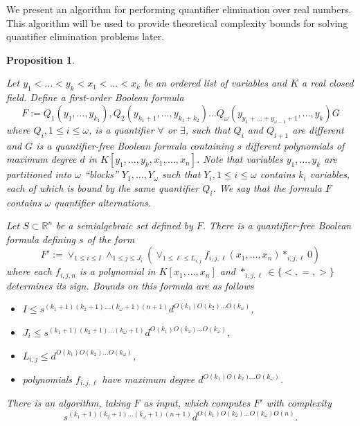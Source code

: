 \documentclass[
]{book}
\providecommand{\tightlist}{%
  \setlength{\itemsep}{0pt}\setlength{\parskip}{0pt}}
\newtheorem{proposition}{Proposition}[chapter]
\theoremstyle{definition}
\theoremstyle{definition}
\theoremstyle{definition}
\theoremstyle{definition}
\theoremstyle{remark}
\begin{document}
We present an algorithm for performing quantifier elimination over real numbers. This algorithm will be used to provide theoretical complexity bounds for solving quantifier elimination problems later.

\begin{proposition}
\protect\hypertarget{prp:bpr-qe}{}\label{prp:bpr-qe}\citep[Algorithm 14.21]{bpr2006}

Let \(y_1 < \ldots < y_k < x_1 < \ldots < x_k\) be an ordered list of variables and \(K\) a real closed field. Define a first-order Boolean formula
\[
F := Q_1 (y_1,\ldots,y_{k_1}), Q_2 (y_{k_1 + 1},\ldots,y_{k_1 + k_2}) \ldots Q_\omega (y_{y_1 + \ldots + y_{\omega-1} + 1},\ldots, y_k) G
\]
where \(Q_i, 1\le i \le \omega\), is a quantifier \(\forall\) or \(\exists\), such that \(Q_i\) and \(Q_{i+1}\) are different and \(G\) is a quantifier-free Boolean formula containing \(s\) different polynomials of maximum degree \(d\) in \(K[y_1,\ldots,y_k,x_1,\ldots,x_n]\).
Note that variables \(y_1,\ldots,y_k\) are partitioned into \(\omega\) ``blocks'' \(Y_1,\ldots,Y_\omega\) such that \(Y_i, 1 \le i \le \omega\) contains \(k_i\) variables, each of which is bound by the same quantifier \(Q_i\).
We say that the formula \(F\) contains \(\omega\) quantifier alternations.

Let \(S \subset \mathbb{R}^n\) be a semialgebraic set defined by \(F\). There is a quantifier-free Boolean formula defining \(s\) of the form
\[
F' := \lor_{1 \le i \le I} \land_{1 \le j \le J_i} \left( \lor_{1 \le \ell \le L_{i,j}} f_{i,j,\ell}(x_1,\ldots,x_n) \ast_{i,j,\ell} 0 \right)
\]
where each \(f_{i,j,n}\) is a polynomial in \(K[x_1,\ldots,x_n]\) and \(\ast_{i,j,\ell} \in \{<, =, >\}\) determines its sign.
Bounds on this formula are as follows

\begin{itemize}
\tightlist
\item
  \(I \le s^{(k_1 + 1)(k_2 + 1) \ldots (k_\omega + 1)(n+1)}d^{O(k_1) O(k_2) \ldots O(k_\omega)}\),
\item
  \(J_i \le s^{(k_1 + 1)(k_2 + 1) \ldots (k_\omega + 1)}d^{O(k_1) O(k_2) \ldots O(k_\omega)}\),
\item
  \(L_{i,j} \le d^{O(k_1) O(k_2) \ldots O(k_\omega)}\),
\item
  polynomials \(f_{i,j,\ell}\) have maximum degree \(d^{O(k_1) O(k_2) \ldots O(k_\omega)}\).
\end{itemize}

There is an algorithm, taking \(F\) as input, which computes \(F'\) with complexity
\[
s^{(k_1 + 1)(k_2 + 1) \ldots (k_\omega + 1)(n+1)}d^{O(k_1) O(k_2) \ldots O(k_\omega)O(n)}.
\]
\end{proposition}
\end{document}
